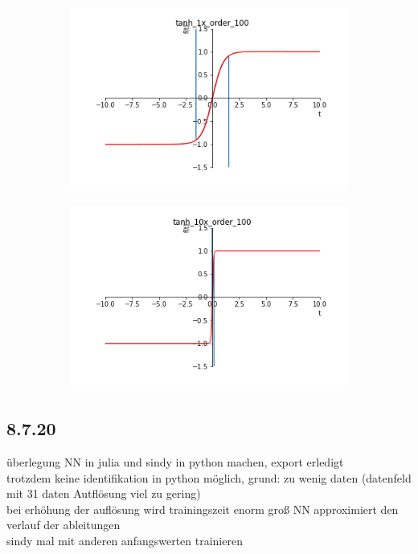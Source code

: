 \documentclass[arbeit=studie,oneside,BCOR=12mm]{ArbeitRST}
\begin{document}
\begin{figure}[ht]
\begin{subfigure}[c]{0.5\textwidth}
\end{subfigure}
\begin{subfigure}[c]{0.5\textwidth}
\centering
\includegraphics[width=1\textwidth]{images/tanh_1x_order_100}

\end{subfigure}
\begin{subfigure}[c]{0.5\textwidth}
\centering
\includegraphics[width=1\textwidth]{images/tanh_10x_order_100}

\end{subfigure}
\end{figure}


\subsection{8.7.20} 
überlegung NN in julia und sindy in python machen, export erledigt\\
trotzdem keine identifikation in python möglich, grund: zu wenig daten (datenfeld mit 31 daten Autflösung viel zu gering)\\
bei erhöhung der auflösung wird trainingszeit enorm groß
NN approximiert den verlauf der ableitungen	\\
sindy mal mit anderen anfangswerten trainieren
\end{document}
